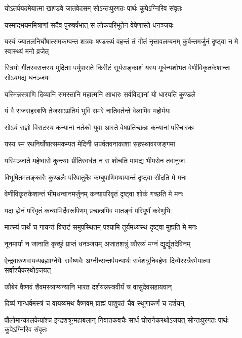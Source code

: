 \twolineshloka
{योऽतर्पयदमेयात्मा खाण्डवे जातवेदसम्}
{सोऽन्तःपुरगतः पार्थः कूपेऽग्निरिव संवृतः}


\twolineshloka
{यस्माद्भयममित्राणां सदैव पुरुषर्षभात्}
{स लोकपरिभूतेन वेषेणास्ते धनञ्जयः}


\threelineshloka
{यस्यं ज्यातलनिर्घोषात्समकम्पन्त शत्रवः}
{षण्डरूपं वहन्तं तं गीतं नृत्तावलम्बनम्}
{कुर्वन्तमर्जुनं दृष्ट्वा न मे स्वास्थ्यं मनो व्रजेत्}


\onelineshloka
{स्त्रियो गीतस्वरात्तस्य मुदिताः पर्युपासते}
\twolineshloka
{किरीटं सूर्यसङ्काशं यस्य मूर्धन्यशोभत}
{वेणीविकृतकेशान्तः सोऽयमद्य धनञ्जयः}


\twolineshloka
{यस्मिन्नस्त्राणि दिव्यानि समस्तानि महात्मनि}
{आधारः सर्वविद्यानां यो धारयति कुण्डले}


\twolineshloka
{यं वै राजसहस्राणि तेजसाऽप्रतिमं भुवि}
{समरे नातिवर्तन्ते वेलामिव महोर्मयः}


\twolineshloka
{सोऽयं राज्ञो विराटस्य कन्यानां नर्तको युवा}
{आस्ते वेषप्रतिच्छन्नः कन्यानां परिचारकः}


\twolineshloka
{यस्य स्म रथनिर्घोषात्समकम्पत मेदिनी}
{सपर्वतवनाकाशा सहस्थावरजङ्गमा}


\twolineshloka
{यस्मिञ्जाते महेष्वासे कुन्त्याः प्रीतिरवर्धत}
{न स शोचति मामद्य भीमसेन तवानुजः}


\twolineshloka
{विभूषितमलङ्कारैः कुण्डलैः परिपातुकैः}
{कम्बुपाणिमथायान्तं दृष्ट्वा सीदति मे मनः}


\twolineshloka
{वेणीविकृतकेशान्तं भीमधन्वानमर्जुनम्}
{कन्यापरिवृतं दृष्ट्वा शोकं गच्छति मे मनः}


\twolineshloka
{यदा ह्येनं परिवृतं कन्याभिर्देवरूपिणम्}
{प्रच्छन्नमिव मातङ्गं परिपूर्णं करेणुभिः}


\twolineshloka
{मात्स्यं पार्थं च गायन्तं विराटं समुपस्थितम्}
{पश्यामि तूर्यमध्यस्थं दृष्ट्वा मुह्यति मे मनः}


\twolineshloka
{नूनमार्या न जानाति कृच्छ्रं प्राप्तं धनञ्जयम्}
{अजातशत्रुं कौरव्यं मग्नं द्युर्द्यूतदेविनम्}


\threelineshloka
{ऐन्द्रवारुणवायव्यब्रह्माग्नेयैः सवैष्णवैः}
{अग्नीन्सन्तर्पयन्पार्थः सर्वशत्रुनिबर्हणः}
{दिव्यैरस्त्रैरमेयात्मा सर्वांश्चैकरथोऽजयत्}


\twolineshloka
{कौबेरं वैष्णवं शैवमस्त्राण्यन्यानि भारत}
{दर्शयन्नस्त्रवीर्यं च वासुदेवसहायवान्}


\twolineshloka
{दिव्यं गान्धर्वमस्त्रं च वायव्यमथ वैष्णवम्}
{ब्राह्मं पाशुपतं चैव स्थूणाकर्णं च दर्शयन्}


\threelineshloka
{पौलोमान्कालकेयांश्च इन्द्रशत्रून्महाबलान्}
{निवातकवचैः सार्धं घोरानेकरथोऽजयत्}
{सोन्तःपुरगतः पार्थः कूपेऽग्निरिव संवृतः}


